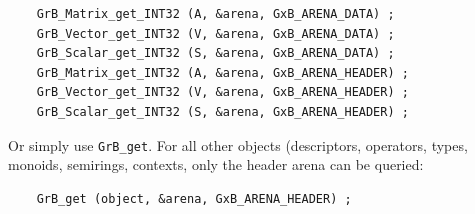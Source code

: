 {\footnotesize
\begin{verbatim}
    GrB_Matrix_get_INT32 (A, &arena, GxB_ARENA_DATA) ;
    GrB_Vector_get_INT32 (V, &arena, GxB_ARENA_DATA) ;
    GrB_Scalar_get_INT32 (S, &arena, GxB_ARENA_DATA) ;
    GrB_Matrix_get_INT32 (A, &arena, GxB_ARENA_HEADER) ;
    GrB_Vector_get_INT32 (V, &arena, GxB_ARENA_HEADER) ;
    GrB_Scalar_get_INT32 (S, &arena, GxB_ARENA_HEADER) ;
\end{verbatim}}

Or simply use \verb'GrB_get'.  For all other objects (descriptors, operators,
types, monoids, semirings, contexts, only the header arena can be queried:

{\footnotesize
\begin{verbatim}
    GrB_get (object, &arena, GxB_ARENA_HEADER) ;
\end{verbatim}}

